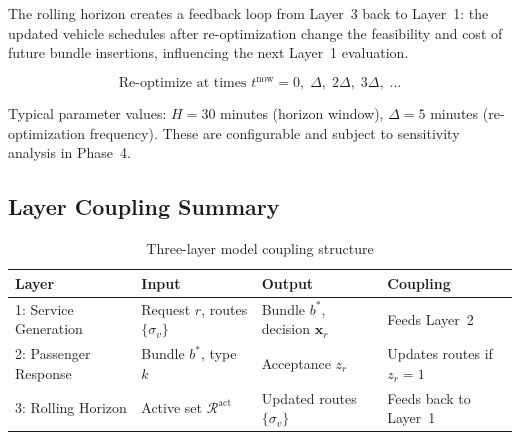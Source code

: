 The rolling horizon creates a feedback loop from Layer~3 back to Layer~1: the updated
vehicle schedules after re-optimization change the feasibility and cost of future bundle
insertions, influencing the next Layer~1 evaluation.

\begin{equation}\label{eq:rh-trigger}
  \text{Re-optimize at times } t^{\text{now}} = 0,\; \Delta,\; 2\Delta,\; 3\Delta,\; \ldots
\end{equation}

Typical parameter values: $H = 30$ minutes (horizon window), $\Delta = 5$ minutes
(re-optimization frequency). These are configurable and subject to sensitivity analysis
in Phase~4.

\subsection*{Layer Coupling Summary}

\begin{table}[h]
\centering
\caption{Three-layer model coupling structure}
\label{tab:layer-coupling}
\begin{tabular}{llll}
\toprule
Layer & Input & Output & Coupling \\
\midrule
1: Service Generation & Request $r$, routes $\{\sigma_v\}$ & Bundle $b^*$, decision $\mathbf{x}_r$ & Feeds Layer~2 \\
2: Passenger Response & Bundle $b^*$, type $k$ & Acceptance $z_r$ & Updates routes if $z_r=1$ \\
3: Rolling Horizon & Active set $\mathcal{R}^{\text{act}}$ & Updated routes $\{\sigma_v\}$ & Feeds back to Layer~1 \\
\bottomrule
\end{tabular}
\end{table}
